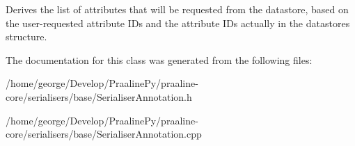 Derives the list of attributes that will be requested from the datastore, based on the user-\/requested attribute I\+Ds and the attribute I\+Ds actually in the datastore\textquotesingle{}s structure. 

The documentation for this class was generated from the following files\+:\begin{DoxyCompactItemize}
\item 
/home/george/\+Develop/\+Praaline\+Py/praaline-\/core/serialisers/base/Serialiser\+Annotation.\+h\item 
/home/george/\+Develop/\+Praaline\+Py/praaline-\/core/serialisers/base/Serialiser\+Annotation.\+cpp\end{DoxyCompactItemize}
